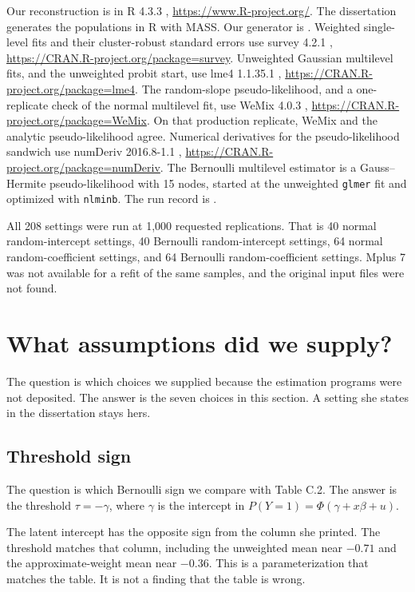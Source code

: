 Our reconstruction is in R 4.3.3 \citep{r2024},
\url{https://www.R-project.org/}.
The dissertation generates the populations in R with MASS.
Our generator is .
Weighted single-level fits and their cluster-robust standard errors use survey
4.2.1 \citep{lumley2004,lumley2024},
\url{https://CRAN.R-project.org/package=survey}.
Unweighted Gaussian multilevel fits, and the unweighted probit start, use
lme4 1.1.35.1 \citep{bates2015},
\url{https://CRAN.R-project.org/package=lme4}.
The random-slope pseudo-likelihood, and a one-replicate check of the normal
multilevel fit, use WeMix 4.0.3 \citep{bailey2023},
\url{https://CRAN.R-project.org/package=WeMix}.
On that production replicate, WeMix and the analytic pseudo-likelihood agree.
Numerical derivatives for the pseudo-likelihood sandwich use numDeriv
2016.8-1.1 \citep{gilbert2019},
\url{https://CRAN.R-project.org/package=numDeriv}.
The Bernoulli multilevel estimator is a Gauss--Hermite pseudo-likelihood with
15 nodes, started at the unweighted \texttt{glmer} fit and optimized with
\texttt{nlminb}.
The run record is .

All 208 settings were run at 1,000 requested replications.
That is 40 normal random-intercept settings, 40 Bernoulli random-intercept
settings, 64 normal random-coefficient settings, and 64 Bernoulli
random-coefficient settings.
Mplus 7 was not available for a refit of the same samples, and the original
input files were not found.

\section{What assumptions did we supply?}

The question is which choices we supplied because the estimation programs were
not deposited.
The answer is the seven choices in this section.
A setting she states in the dissertation stays hers.

\subsection{Threshold sign}

The question is which Bernoulli sign we compare with Table C.2.
The answer is the threshold $\tau=-\gamma$, where $\gamma$ is the intercept
in $P(Y=1)=\Phi(\gamma+x\beta+u)$.

The latent intercept has the opposite sign from the column she printed.
The threshold matches that column, including the unweighted mean near $-0.71$
and the approximate-weight mean near $-0.36$.
This is a parameterization that matches the table.
It is not a finding that the table is wrong.

